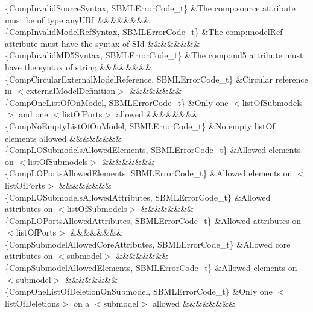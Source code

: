 \begin{DoxyParagraph}{}
\begin{longtabu}
\{Comp\+Invalid\+Source\+Syntax, S\+B\+M\+L\+Error\+Code\+\_\+t\} &The \textquotesingle{}comp\+:source\textquotesingle{} attribute must be of type \textquotesingle{}any\+U\+RI\textquotesingle{} &&&&&&&&\\
\{Comp\+Invalid\+Model\+Ref\+Syntax, S\+B\+M\+L\+Error\+Code\+\_\+t\} &The \textquotesingle{}comp\+:model\+Ref\textquotesingle{} attribute must have the syntax of \textquotesingle{}S\+Id\textquotesingle{} &&&&&&&&\\
\{Comp\+Invalid\+M\+D5\+Syntax, S\+B\+M\+L\+Error\+Code\+\_\+t\} &The \textquotesingle{}comp\+:md5\textquotesingle{} attribute must have the syntax of \textquotesingle{}string\textquotesingle{} &&&&&&&&\\
\{Comp\+Circular\+External\+Model\+Reference, S\+B\+M\+L\+Error\+Code\+\_\+t\} &Circular reference in {\ttfamily $<$external\+Model\+Definition$>$} &&&&&&&&\\
\{Comp\+One\+List\+Of\+On\+Model, S\+B\+M\+L\+Error\+Code\+\_\+t\} &Only one {\ttfamily $<$list\+Of\+Submodels$>$} and one {\ttfamily $<$list\+Of\+Ports$>$} allowed &&&&&&&&\\
\{Comp\+No\+Empty\+List\+Of\+On\+Model, S\+B\+M\+L\+Error\+Code\+\_\+t\} &No empty list\+Of elements allowed &&&&&&&&\\
\{Comp\+L\+O\+Submodels\+Allowed\+Elements, S\+B\+M\+L\+Error\+Code\+\_\+t\} &Allowed elements on {\ttfamily $<$list\+Of\+Submodels$>$} &&&&&&&&\\
\{Comp\+L\+O\+Ports\+Allowed\+Elements, S\+B\+M\+L\+Error\+Code\+\_\+t\} &Allowed elements on {\ttfamily $<$list\+Of\+Ports$>$} &&&&&&&&\\
\{Comp\+L\+O\+Submodels\+Allowed\+Attributes, S\+B\+M\+L\+Error\+Code\+\_\+t\} &Allowed attributes on {\ttfamily $<$list\+Of\+Submodels$>$} &&&&&&&&\\
\{Comp\+L\+O\+Ports\+Allowed\+Attributes, S\+B\+M\+L\+Error\+Code\+\_\+t\} &Allowed attributes on {\ttfamily $<$list\+Of\+Ports$>$} &&&&&&&&\\
\{Comp\+Submodel\+Allowed\+Core\+Attributes, S\+B\+M\+L\+Error\+Code\+\_\+t\} &Allowed core attributes on {\ttfamily $<$submodel$>$} &&&&&&&&\\
\{Comp\+Submodel\+Allowed\+Elements, S\+B\+M\+L\+Error\+Code\+\_\+t\} &Allowed elements on {\ttfamily $<$submodel$>$} &&&&&&&&\\
\{Comp\+One\+List\+Of\+Deletion\+On\+Submodel, S\+B\+M\+L\+Error\+Code\+\_\+t\} &Only one {\ttfamily $<$list\+Of\+Deletions$>$} on a {\ttfamily $<$submodel$>$} allowed &&&&&&&&\\

\end{longtabu}
\end{DoxyParagraph}
